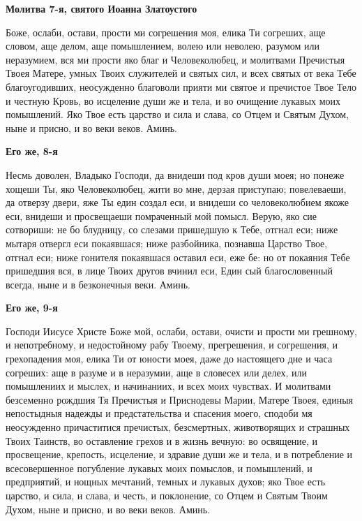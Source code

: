 \bfseries Молитва 7-я, святого Иоанна Златоустого\normalfont{}


Боже, ослаби, остави, прости ми согрешения моя, елика Ти согреших, аще словом, аще делом, аще помышлением, волею или неволею, разумом или неразумием, вся ми прости яко благ и Человеколюбец, и молитвами Пречистыя Твоея Матере, умных Твоих служителей и святых сил, и всех святых от века Тебе благоугодивших, неосужденно благоволи прияти ми святое и пречистое Твое Тело и честную Кровь, во исцеление души же и тела, и во очищение лукавых моих помышлений. Яко Твое есть царство и сила и слава, со Отцем и Святым Духом, ныне и присно, и во веки веков. Аминь.




\bfseries Его же, 8-я\normalfont{}


Несмь доволен, Владыко Господи, да внидеши под кров души моея; но понеже хощеши Ты, яко Человеколюбец, жити во мне, дерзая приступаю; повелеваеши, да отверзу двери, яже Ты един создал еси, и внидеши со человеколюбием якоже еси, внидеши и просвещаеши помраченный мой помысл. Верую, яко сие сотвориши: не бо блудницу, со слезами пришедшую к Тебе, отгнал еси; ниже мытаря отвергл еси покаявшася; ниже разбойника, познавша Царство Твое, отгнал еси; ниже гонителя покаявшася оставил еси, еже бе: но от покаяния Тебе пришедшия вся, в лице Твоих другов вчинил еси, Един сый благословенный всегда, ныне и в безконечныя веки. Аминь.




\bfseries Его же, 9-я\normalfont{}


Господи Иисусе Христе Боже мой, ослаби, остави, очисти и прости ми грешному, и непотребному, и недостойному рабу Твоему, прегрешения, и согрешения, и грехопадения моя, елика Ти от юности моея, даже до настоящего дне и часа согреших: аще в разуме и в неразумии, аще в словесех или делех, или помышлениих и мыслех, и начинаниих, и всех моих чувствах. И молитвами безсеменно рождшия Тя Пречистыя и Приснодевы Марии, Матере Твоея, единыя непостыдныя надежды и предстательства и спасения моего, сподоби мя неосужденно причаститися пречистых, безсмертных, животворящих и страшных Твоих Таинств, во оставление грехов и в жизнь вечную: во освящение, и просвещение, крепость, исцеление, и здравие души же и тела, и в потребление и всесовершенное погубление лукавых моих помыслов, и помышлений, и предприятий, и нощных мечтаний, темных и лукавых духов; яко Твое есть царство, и сила, и слава, и честь, и поклонение, со Отцем и Святым Твоим Духом, ныне и присно, и во веки веков. Аминь.




